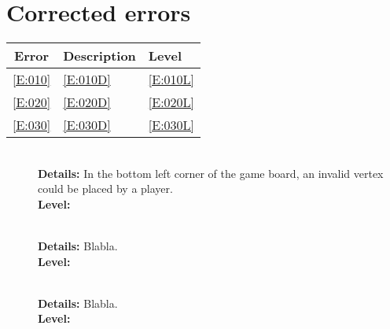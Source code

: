\section{Corrected errors}

\begin{tabular}{cll}

\hline
	\textbf{Error} & \textbf{Description} & \textbf{Level} \\
	\hline
	\ref{E:010} & \ref{E:010D} & \ref{E:010L} \\
	\ref{E:020} & \ref{E:020D} & \ref{E:020L} \\
	\ref{E:030} & \ref{E:030D} & \ref{E:030L} \\
	\hline
\end{tabular}

\begin{description}
	\item[] \textbf{} \\
	\textbf{Details:} In the bottom left corner of the \twixt game board, an invalid vertex could be placed by a player. \\
	\textbf{Level:} 

	\item[] \textbf{} \\
	\textbf{Details:} Blabla. \\
	\textbf{Level:} 

	\item[] \textbf{} \\
	\textbf{Details:} Blabla. \\
	\textbf{Level:} 
\end{description}

